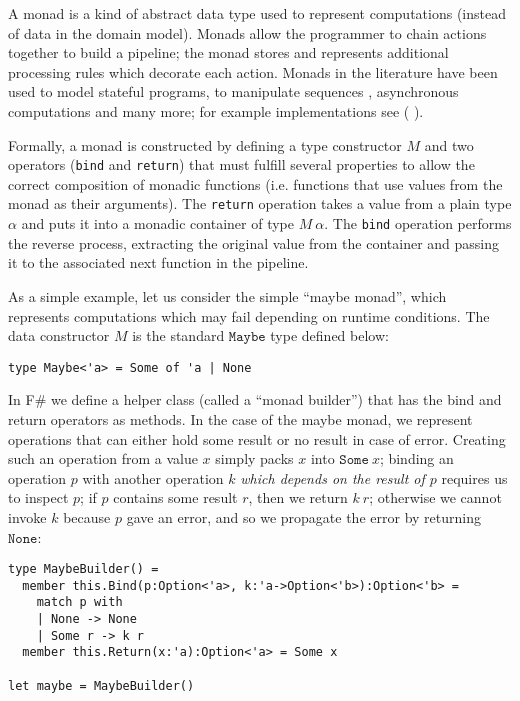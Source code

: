 
A monad \cite{MOGGI_MON,DECL_IMP,COMPR_MON,EFF_MON} is a kind of
abstract data type used to represent computations (instead of data in
the domain model). Monads allow the programmer to chain actions
together to build a pipeline; the monad stores and represents
additional processing rules which decorate each action. Monads in the
literature have been used to model stateful programs, to manipulate
sequences , asynchronous computations and many more; for example
implementations see (\cite{CSHARP_ASYNC} \cite{CSHARP_LINQ}). 

Formally, a monad is constructed by defining a type constructor $M$
and two operators (\texttt{bind} and \texttt{return}) that must
fulfill several properties to allow the correct composition of monadic
functions (i.e. functions that use values from the monad as their
arguments). The \texttt{return} operation takes a value from a plain
type $\alpha$ and puts it into a monadic container of type $M\ \alpha$. The
\texttt{bind} operation performs the reverse process, extracting the
original value from the container and passing it to the associated
next function in the pipeline. 

As a simple example, let us consider the simple ``maybe monad'', which
represents computations which may fail depending on runtime
conditions. The data constructor $M$ is the standard $\mathtt{Maybe}$
type defined below: 
\begin{lstlisting}
type Maybe<'a> = Some of 'a | None
\end{lstlisting}

In F\# we define a helper class (called a ``monad builder'') that has
the bind and return operators as methods. In the case of the maybe
monad, we represent operations that can either hold some result or no
result in case of error. Creating such an operation from a value $x$
simply packs $x$ into $\mathtt{Some}\ x$; binding an operation $p$ with another
operation $k$ \textit{which depends on the result of $p$} requires us
to inspect $p$; if $p$ contains some result $r$, then we return $k\
r$; otherwise we cannot invoke $k$ because $p$ gave an error, and so
we propagate the error by returning $\mathtt{None}$: 

\begin{lstlisting}
type MaybeBuilder() =
  member this.Bind(p:Option<'a>, k:'a->Option<'b>):Option<'b> =
    match p with
    | None -> None
    | Some r -> k r
  member this.Return(x:'a):Option<'a> = Some x

let maybe = MaybeBuilder()
\end{lstlisting}

